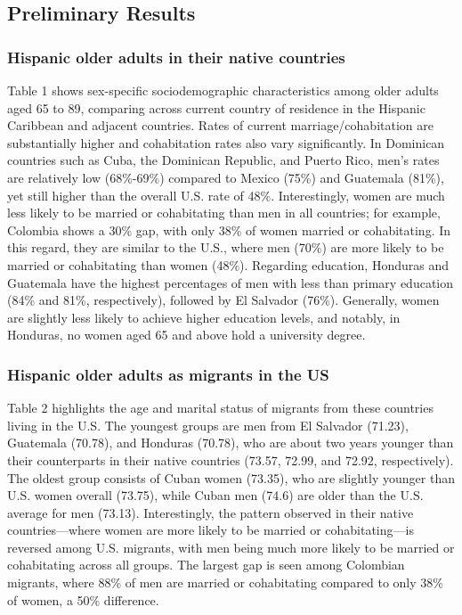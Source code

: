 \documentclass[
]{article}
\begin{document}
\subsection{Preliminary Results}\label{preliminary-results}

\subsubsection{Hispanic older adults in their native
countries}\label{hispanic-older-adults-in-their-native-countries}

Table 1 shows sex-specific sociodemographic characteristics among older
adults aged 65 to 89, comparing across current country of residence in
the Hispanic Caribbean and adjacent countries. Rates of current
marriage/cohabitation are substantially higher and cohabitation rates
also vary significantly. In Dominican countries such as Cuba, the
Dominican Republic, and Puerto Rico, men's rates are relatively low
(68\%-69\%) compared to Mexico (75\%) and Guatemala (81\%), yet still
higher than the overall U.S. rate of 48\%. Interestingly, women are much
less likely to be married or cohabitating than men in all countries; for
example, Colombia shows a 30\% gap, with only 38\% of women married or
cohabitating. In this regard, they are similar to the U.S., where men
(70\%) are more likely to be married or cohabitating than women (48\%).
Regarding education, Honduras and Guatemala have the highest percentages
of men with less than primary education (84\% and 81\%, respectively),
followed by El Salvador (76\%). Generally, women are slightly less
likely to achieve higher education levels, and notably, in Honduras, no
women aged 65 and above hold a university degree.

\subsubsection{Hispanic older adults as migrants in the
US}\label{hispanic-older-adults-as-migrants-in-the-us}

Table 2 highlights the age and marital status of migrants from these
countries living in the U.S. The youngest groups are men from El
Salvador (71.23), Guatemala (70.78), and Honduras (70.78), who are about
two years younger than their counterparts in their native countries
(73.57, 72.99, and 72.92, respectively). The oldest group consists of
Cuban women (73.35), who are slightly younger than U.S. women overall
(73.75), while Cuban men (74.6) are older than the U.S. average for men
(73.13). Interestingly, the pattern observed in their native
countries---where women are more likely to be married or
cohabitating---is reversed among U.S. migrants, with men being much more
likely to be married or cohabitating across all groups. The largest gap
is seen among Colombian migrants, where 88\% of men are married or
cohabitating compared to only 38\% of women, a 50\% difference.
\end{document}
